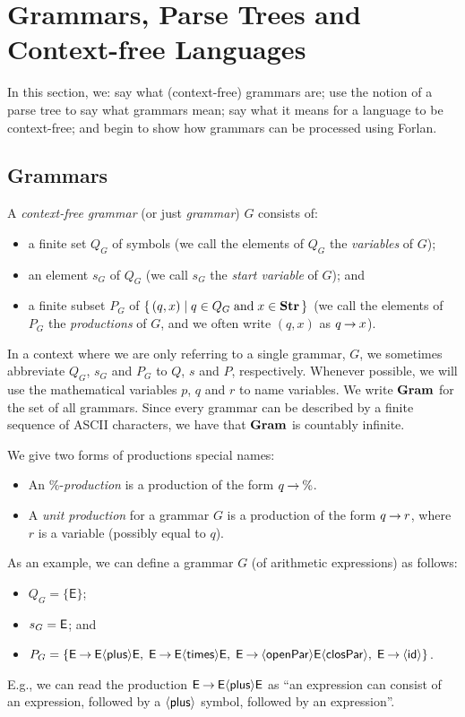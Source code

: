 \section{Grammars, Parse Trees and Context-free Languages}
\label{GrammarsParseTreesAndContextFreeLanguages}

In this section, we: say what (context-free) grammars are; use the
notion of a parse tree to say what grammars mean; say what it means
for a language to be context-free; and begin to show how grammars can
be processed using Forlan.

\subsection{Grammars}

A \emph{context-free grammar} (or just \emph{grammar}) $G$ consists of:
\begin{itemize}
\item a finite set $Q_G$ of symbols (we call the elements of $Q_G$
the \emph{variables} of $G$);

\item an element $s_G$ of $Q_G$ (we call $s_G$ the \emph{start variable}
of $G$); and

\item a finite subset $P_G$ of $\{ \, (q,x) \mid q\in Q_G\;\allowbreak\mbox{and}\allowbreak\;
x\in\mathbf{Str} \, \}$ (we call the elements of $P_G$ the \emph{productions} of
$G$, and we often write $(q, x)$ as $q\mathbin{\to} x$).
\end{itemize}

In a context where we are only referring to a single grammar, $G$, we
sometimes abbreviate $Q_G$, $s_G$ and $P_G$ to $Q$, $s$ and $P$,
respectively.  Whenever possible, we will use the mathematical
variables $p$, $q$ and $r$ to name variables.  We write $\mathbf{Gram}$ for
the set of all grammars.  Since every grammar can be described by a
finite sequence of ASCII characters, we have that $\mathbf{Gram}$ is countably
infinite.

We give two forms of productions special names:
\begin{itemize}
\item An $\%$-\emph{production} is a production of the form $q\mathbin{\to}\%$.

\item A \emph{unit production} for a grammar $G$ is a production of
  the form $q\mathbin{\to} r$, where $r$ is a variable (possibly equal to $q$).
\end{itemize}

As an example, we can define a grammar $G$ (of arithmetic expressions) as
follows:
\begin{itemize}
\item $Q_G=\{\mathsf{E}\}$;

\item $s_G=\mathsf{E}$; and

\item $P_G=\{\mathsf{E\mathbin{\to} E{\langle\mathsf{plus}\rangle} E,\;
E\mathbin{\to} E{\langle\mathsf{times}\rangle} E,\;
E\mathbin{\to}{\langle\mathsf{openPar}\rangle} E{\langle\mathsf{closPar}\rangle},\;
E\mathbin{\to}{\langle\mathsf{id}\rangle}}\}$.
\end{itemize}
E.g., we can read the production $\mathsf{E}\mathbin{\to}\mathsf{E}{\langle\mathsf{plus}\rangle}\mathsf{E}$
as ``an expression can consist of an expression, followed by
a ${\langle\mathsf{plus}\rangle}$ symbol, followed by an expression''.

